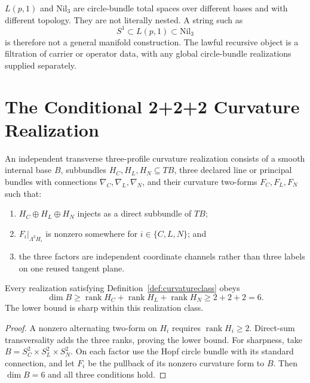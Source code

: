 \documentclass[11pt]{article}
\begin{document}
\begin{remark}
$L(p,1)$ and $\mathrm{Nil}_3$ are circle-bundle total spaces over different
bases and with different topology.  They are not literally nested.  A string
such as
\[
S^1\subset L(p,1)\subset\mathrm{Nil}_3
\]
is therefore not a general manifold construction.  The lawful recursive
object is a filtration of carrier or operator data, with any global
circle-bundle realizations supplied separately.
\end{remark}

\section{The Conditional 2+2+2 Curvature Realization}

\begin{definition}
\label{def:curvatureclass}
An independent transverse three-profile curvature realization consists of a
smooth internal base $B$, subbundles
$H_C,H_L,H_N\subseteq TB$, three declared line or principal bundles with
connections $\nabla_C,\nabla_L,\nabla_N$, and their curvature two-forms
$F_C,F_L,F_N$ such that:
\begin{enumerate}[label=(R\arabic*)]
\item $H_C\oplus H_L\oplus H_N$ injects as a direct subbundle of $TB$;
\item $F_i|_{\Lambda^2H_i}$ is nonzero somewhere for
$i\in\{C,L,N\}$; and
\item the three factors are independent coordinate channels rather than
three labels on one reused tangent plane.
\end{enumerate}
\end{definition}

\begin{theorem}
\label{thm:six}
Every realization satisfying Definition~\ref{def:curvatureclass} obeys
\[
\dim B
\geq
\operatorname{rank}H_C+
\operatorname{rank}H_L+
\operatorname{rank}H_N
\geq 2+2+2=6.
\]
The lower bound is sharp within this realization class.
\end{theorem}

\begin{proof}
A nonzero alternating two-form on $H_i$ requires
$\operatorname{rank}H_i\geq2$.  Direct-sum transversality adds the three
ranks, proving the lower bound.  For sharpness, take
$B=S^2_C\times S^2_L\times S^2_N$.  On each factor use the Hopf circle
bundle with its standard connection, and let $F_i$ be the pullback of its
nonzero curvature form to $B$.  Then $\dim B=6$ and all three conditions
hold.
\end{proof}
\end{document}
